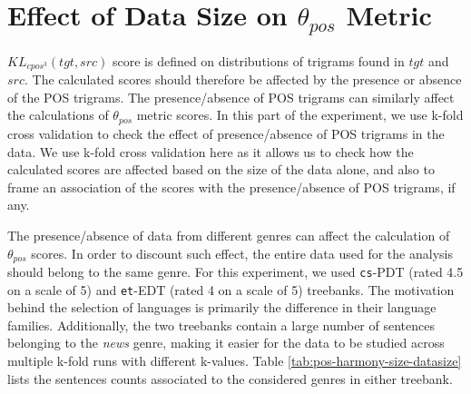     \begin{table}[H]
    \end{table}
    
\section{Effect of Data Size on \(\theta_{pos}\) Metric}
\label{sec:pos-harmony-size}

\(KL_{cpos^{3}}(tgt, src)\) score is defined on distributions of trigrams found in \(tgt\) and \(src\). The calculated scores should therefore be affected by the presence or absence of the POS trigrams. The presence/absence of POS trigrams can similarly affect the calculations of \(\theta_{pos}\) metric scores. In this part of the experiment, we use k-fold cross validation to check the effect of presence/absence of POS trigrams in the data. We use k-fold cross validation here as it allows us to check how the calculated scores are affected based on the size of the data alone, and also to frame an association of the scores with the presence/absence of POS trigrams, if any. 

The presence/absence of data from different genres can affect the calculation of \(\theta_{pos}\) scores. In order to discount such effect, the entire data used for the analysis should belong to the same genre. For this experiment, we used \verb|cs|-PDT (rated 4.5 on a scale of 5) and \verb|et|-EDT (rated 4 on a scale of 5) treebanks. The motivation behind the selection of languages is primarily the difference in their language families. Additionally, the two treebanks contain a large number of sentences belonging to the \textit{news} genre, making it easier for the data to be studied across multiple k-fold runs with different k-values. Table \ref{tab:pos-harmony-size-datasize} lists the sentences counts associated to the considered genres in either treebank.

